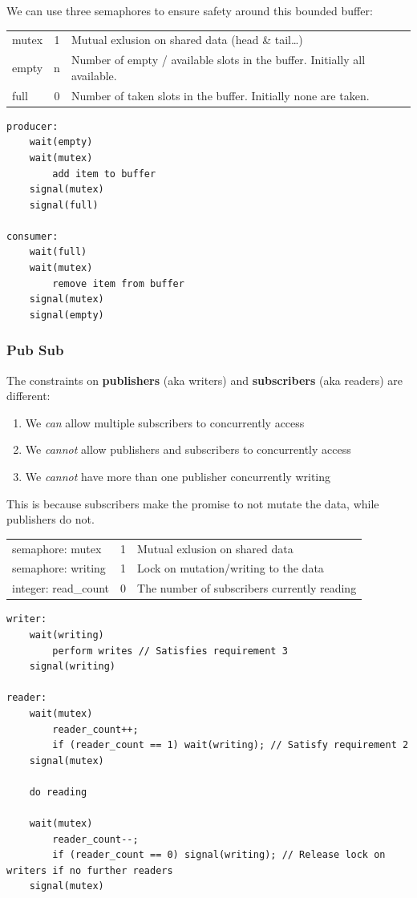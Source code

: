 \documentclass{article}
\begin{document}
We can use three semaphores to ensure safety around this bounded buffer:

\begin{tabular}{l | c | l }
mutex & 1 & Mutual exlusion on shared data (head \& tail\ldots{})\\
empty & n & Number of empty / available slots in the buffer. Initially all available.\\
full  & 0 & Number of taken slots in the buffer. Initially none are taken.
\end{tabular}

\begin{verbatim}
producer:
    wait(empty)
    wait(mutex)
        add item to buffer
    signal(mutex)
    signal(full)

consumer:
    wait(full)
    wait(mutex)
        remove item from buffer
    signal(mutex)
    signal(empty)
\end{verbatim}

\subsubsection{Pub Sub}\label{pub-sub}

The constraints on \textbf{publishers} (aka writers) and
\textbf{subscribers} (aka readers) are different:

\begin{enumerate}
\item
  We \emph{can} allow multiple subscribers to concurrently access
\item
  We \emph{cannot} allow publishers and subscribers to concurrently
  access
\item
  We \emph{cannot} have more than one publisher concurrently writing
\end{enumerate}

This is because subscribers make the promise to not mutate the data,
while publishers do not.

\begin{tabular}{l | c | l }
semaphore: mutex     & 1 & Mutual exlusion on shared data\\
semaphore: writing   & 1 & Lock on mutation/writing to the data\\
integer: read\_count & 0 & The number of subscribers currently reading
\end{tabular}

\begin{verbatim}
writer:
    wait(writing)
        perform writes // Satisfies requirement 3
    signal(writing)
    
reader:
    wait(mutex)
        reader_count++;
        if (reader_count == 1) wait(writing); // Satisfy requirement 2
    signal(mutex)
    
    do reading
    
    wait(mutex)
        reader_count--;
        if (reader_count == 0) signal(writing); // Release lock on writers if no further readers
    signal(mutex)
\end{verbatim}
\end{document}
